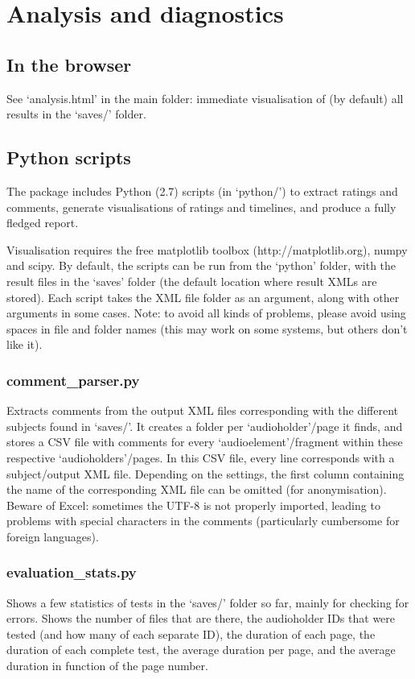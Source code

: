 \documentclass[11pt, oneside]{article}   	%
\begin{document}
\clearpage
\section{Analysis and diagnostics}
	\subsection{In the browser}
		See `analysis.html' in the main folder: immediate visualisation of (by default) all results in the `saves/' folder. 

	\subsection{Python scripts}
		The package includes Python (2.7) scripts (in `python/') to extract ratings and comments, generate visualisations of ratings and timelines, and produce a fully fledged report. 

		Visualisation requires the free matplotlib toolbox (http://matplotlib.org), numpy and scipy. 
		By default, the scripts can be run from the `python' folder, with the result files in the `saves' folder (the default location where result XMLs are stored). Each script takes the XML file folder as an argument, along with other arguments in some cases.
		Note: to avoid all kinds of problems, please avoid using spaces in file and folder names (this may work on some systems, but others don't like it). 

		\subsubsection{comment\_parser.py}
			Extracts comments from the output XML files corresponding with the different subjects found in `saves/'. It creates a folder per `audioholder'/page it finds, and stores a CSV file with comments for every `audioelement'/fragment within these respective `audioholders'/pages. In this CSV file, every line corresponds with a subject/output XML file. Depending on the settings, the first column containing the name of the corresponding XML file can be omitted (for anonymisation). 
			Beware of Excel: sometimes the UTF-8 is not properly imported, leading to problems with special characters in the comments (particularly cumbersome for foreign languages). 

		\subsubsection{evaluation\_stats.py}
			Shows a few statistics of tests in the `saves/' folder so far, mainly for checking for errors. Shows the number of files that are there, the audioholder IDs that were tested (and how many of each separate ID), the duration of each page, the duration of each complete test, the average duration per page, and the average duration in function of the page number. 
\end{document}
